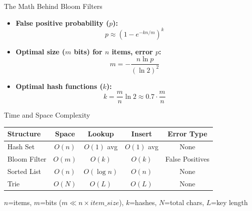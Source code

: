 \begin{frame}{The Math Behind Bloom Filters}
  \begin{itemize}
    \item \textbf{False positive probability ($p$):}
          \begin{equation}
            p \approx \left(1 - e^{-kn/m}\right)^k
          \end{equation}\parencite{im/1109191032}

    \item \textbf{Optimal size ($m$ bits) for $n$ items, error $p$:}
          \begin{equation}
            m = -\frac{n \ln p}{(\ln 2)^2}
          \end{equation}

    \item \textbf{Optimal hash functions ($k$):}
          \begin{equation}
            k = \frac{m}{n} \ln 2 \approx 0.7 \cdot \frac{m}{n}
          \end{equation}
  \end{itemize}
\end{frame}

\begin{frame}{Time and Space Complexity}
  \begin{center}
    \begin{tabular}{l|c|c|c|c}
      \textbf{Structure} & \textbf{Space} & \textbf{Lookup} & \textbf{Insert} & \textbf{Error Type} \\
      \hline
      Hash Set           & $O(n)$         & $O(1)$ avg      & $O(1)$ avg      & None                \\
      Bloom Filter       & $O(m)$         & $O(k)$          & $O(k)$          & False Positives     \\
      Sorted List        & $O(n)$         & $O(\log n)$     & $O(n)$          & None                \\
      Trie               & $O(N)$         & $O(L)$          & $O(L)$          & None                \\
    \end{tabular}
  \end{center}

  $n$=items, $m$=bits ($m \ll n \times item\_size$), $k$=hashes, $N$=total chars, $L$=key length
\end{frame}

